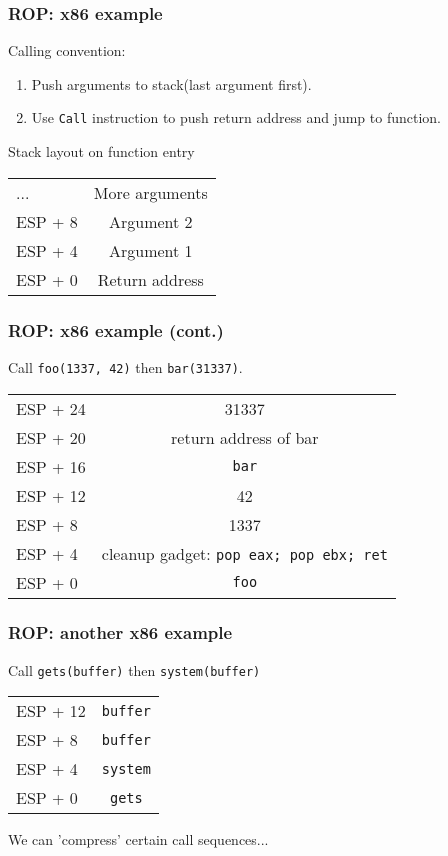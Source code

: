 \documentclass{beamer}
\begin{document}
\begin{frame}
    \frametitle{ROP: x86 example}

    \pause Calling convention:
    \begin{enumerate}
        \item Push arguments to stack(last argument first).
        \item Use \texttt{Call} instruction to push return address and jump to function.
    \end{enumerate}
    
    \pause Stack layout on function entry
    \begin{center}
    \begin{tabular}{l|c}
        ...     & More arguments \\
        ESP + 8 & Argument 2 \\
        ESP + 4 & Argument 1 \\
        ESP + 0 & Return address \\
    \end{tabular}
    \end{center}
\end{frame}

\begin{frame}
    \frametitle{ROP: x86 example (cont.)}
    Call \texttt{foo(1337, 42)} then \texttt{bar(31337)}.
    \pause
    \begin{center}
    \begin{tabular}{l|c}
        ESP + 24 & 31337 \\
        ESP + 20 & return address of bar \\
        ESP + 16 & \texttt{bar} \\
        ESP + 12 & 42 \\
        ESP + 8  & 1337 \\
        ESP + 4  & cleanup gadget: \texttt{pop eax; pop ebx; ret} \\
        ESP + 0  & \texttt{foo}
    \end{tabular}
    \end{center}
\end{frame}

\begin{frame}
    \frametitle{ROP: another x86 example}
    Call \texttt{gets(buffer)} then \texttt{system(buffer)}
    \pause
    \begin{center}
    \begin{tabular}{l|c}
        ESP + 12 & \texttt{buffer} \\
        ESP + 8  & \texttt{buffer} \\
        ESP + 4  & \texttt{system} \\
        ESP + 0  & \texttt{gets}
    \end{tabular}
    \end{center}
    \pause We can 'compress' certain call sequences...
\end{frame}
\end{document}
